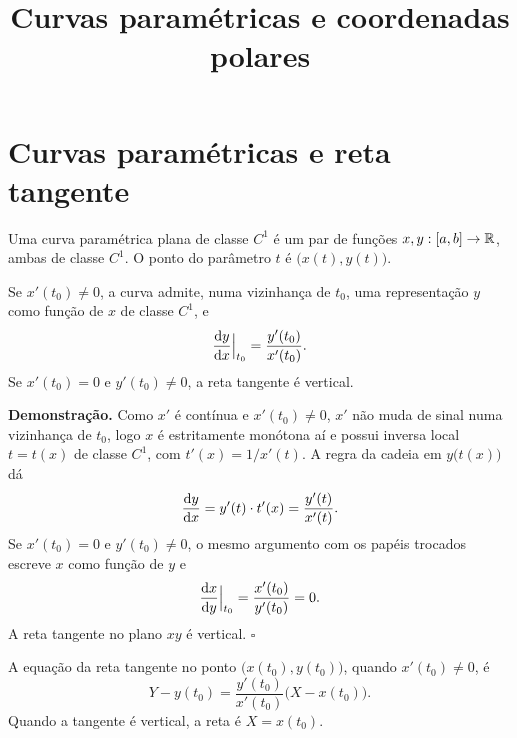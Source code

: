 \documentclass[11pt,a4paper]{article}
\title{Curvas paramétricas e coordenadas polares}
\author{}
\date{}
\begin{document}
\maketitle
\tableofcontents


\section{Curvas paramétricas e reta tangente}

\begin{definicao}
Uma curva paramétrica plana de classe \(C^1\) é um par de funções \(x,y:[a,b]\to\mathbb{R}\), ambas de classe \(C^1\). O ponto do parâmetro \(t\) é \(\bigl(x(t),y(t)\bigr)\).
\end{definicao}

\begin{teorema}
Se \(x'(t_{0})\neq 0\), a curva admite, numa vizinhança de \(t_{0}\), uma representação \(y\) como função de \(x\) de classe \(C^1\), e
\[
\frac{\mathrm{d} y}{\mathrm{d} x}\Big|_{t_{0}}
=\frac{y'(t_{0})}{x'(t_{0})}.
\]
Se \(x'(t_{0})=0\) e \(y'(t_{0})\neq 0\), a reta tangente é vertical.
\end{teorema}

\noindent\textbf{Demonstração.}
Como \(x'\) é contínua e \(x'(t_{0})\neq 0\), \(x'\) não muda de sinal numa vizinhança de \(t_{0}\), logo \(x\) é estritamente monótona aí e possui inversa local \(t=t(x)\) de classe \(C^1\), com \(t'(x)=1/x'(t)\). A regra da cadeia em \(y\bigl(t(x)\bigr)\) dá
\[
\frac{\mathrm{d} y}{\mathrm{d} x}
=y'(t)\cdot t'(x)
=\frac{y'(t)}{x'(t)}.
\]
Se \(x'(t_{0})=0\) e \(y'(t_{0})\neq 0\), o mesmo argumento com os papéis trocados escreve \(x\) como função de \(y\) e
\[
\frac{\mathrm{d} x}{\mathrm{d} y}\Big|_{t_{0}}
=\frac{x'(t_{0})}{y'(t_{0})}=0.
\]
A reta tangente no plano \(xy\) é vertical.
\hfill\(\square\)

A equação da reta tangente no ponto \(\bigl(x(t_{0}),y(t_{0})\bigr)\), quando \(x'(t_{0})\neq 0\), é
\[
Y-y(t_{0})=\frac{y'(t_{0})}{x'(t_{0})}\bigl(X-x(t_{0})\bigr).
\]
Quando a tangente é vertical, a reta é \(X=x(t_{0})\).
\end{document}
